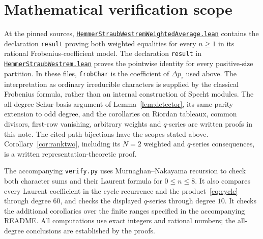 \documentclass[11pt]{article}
\begin{document}
\section{Mathematical verification scope}
At the pinned sources,
\href{https://github.com/the-omega-institute/trureturing/blob/439c57ca26fd0c0d2de1f48bc492717bc6f7597c/D5/S3/Combinatorics/Partitions/HemmerStraubWestremWeightedAverage.lean}{\texttt{HemmerStraubWestremWeightedAverage.lean}}
contains the declaration \texttt{result} proving both weighted equalities
for every $n\geq1$ in its rational Frobenius-coefficient model.
The declaration \texttt{result} in
\href{https://github.com/the-omega-institute/trureturing/blob/439c57ca26fd0c0d2de1f48bc492717bc6f7597c/D5/S3/Combinatorics/Partitions/HemmerStraubWestrem.lean}{\texttt{HemmerStraubWestrem.lean}}
proves the pointwise identity for every positive-size partition.
In these files, \texttt{frobChar} is the coefficient of
$\Delta p_\tau$ used above. The interpretation as ordinary irreducible
characters is supplied by the classical Frobenius formula, rather than an
internal construction of Specht modules.
The all-degree Schur-basis argument of Lemma~\ref{lem:detector}, its
same-parity extension to odd degree, and the corollaries on Riordan
tableaux, common divisors, first-row vanishing, arbitrary weights and
$q$-series are written proofs in this note. The cited path bijections
have the scopes stated above.
Corollary~\ref{cor:ranktwo}, including its $N=2$ weighted and $q$-series
consequences, is a written representation-theoretic proof.

The accompanying \texttt{verify.py} uses Murnaghan--Nakayama recursion to
check both character sums and their Laurent formula for $0\leq n\leq8$.
It also compares every Laurent coefficient in the cycle recurrence and
the product~\eqref{eq:cycle} through degree $60$, and checks the displayed
$q$-series through degree $10$. It checks the additional corollaries
over the finite ranges specified in the accompanying README.
All computations use exact integers and
rational numbers; the all-degree conclusions are established by the proofs.
\end{document}
